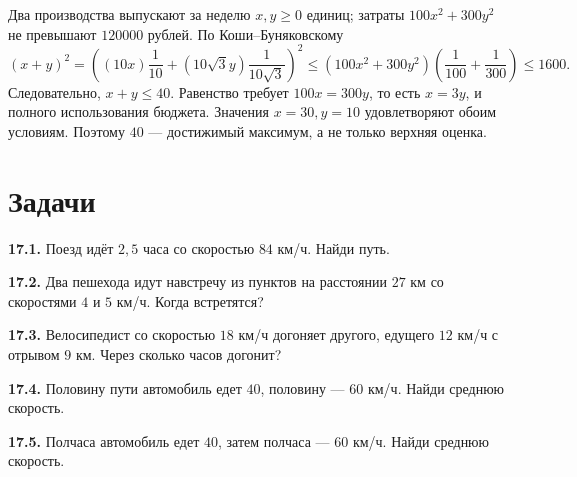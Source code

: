 \begin{example}\label{ex:review-ege-exam-models-4}
Два производства выпускают за неделю \(x,y\ge0\) единиц; затраты \(100x^2+300y^2\) не превышают \(120000\) рублей. По Коши--Буняковскому
\[
(x+y)^2=
\left((10x)\frac1{10}+(10\sqrt3y)\frac1{10\sqrt3}\right)^2
\le(100x^2+300y^2)\left(\frac1{100}+\frac1{300}\right)
\le1600.
\]
Следовательно, \(x+y\le40\). Равенство требует \(100x=300y\), то есть \(x=3y\), и полного использования бюджета. Значения \(x=30,y=10\) удовлетворяют обоим условиям. Поэтому \(40\) — достижимый максимум, а не только верхняя оценка.
\end{example}
\section*{Задачи}
\begingroup\setlength{\parskip}{1pt}
\noindent\begin{minipage}[t]{\linewidth}\textbf{17.1.} Поезд идёт \(2{,}5\) часа со скоростью \(84\) км/ч. Найди путь.\par\end{minipage}\par
\noindent\begin{minipage}[t]{\linewidth}\textbf{17.2.} Два пешехода идут навстречу из пунктов на расстоянии \(27\) км со скоростями \(4\) и \(5\) км/ч. Когда встретятся?\par\end{minipage}\par
\noindent\begin{minipage}[t]{\linewidth}\textbf{17.3.} Велосипедист со скоростью \(18\) км/ч догоняет другого, едущего \(12\) км/ч с отрывом \(9\) км. Через сколько часов догонит?\par\end{minipage}\par
\noindent\begin{minipage}[t]{\linewidth}\textbf{17.4.} Половину пути автомобиль едет \(40\), половину --- \(60\) км/ч. Найди среднюю скорость.\par\end{minipage}\par
\noindent\begin{minipage}[t]{\linewidth}\textbf{17.5.} Полчаса автомобиль едет \(40\), затем полчаса --- \(60\) км/ч. Найди среднюю скорость.\par\end{minipage}\par
